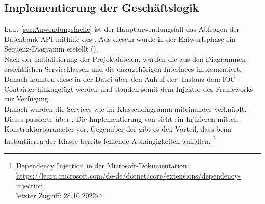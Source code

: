 \subsection{Implementierung der Geschäftslogik}
\label{sec:ImplementierungGeschaeftslogik}
Laut \ref{sec:Anwendungsfaelle}  ist der Hauptanwendungsfall
das Abfragen der Datenbank-\acs{API} mithilfe des . Aus diesem wurde in 
der Entwurfsphase ein Sequenz-Diagramm erstellt (\Vgl {}).\\
Nach der Initialisierung der Projektdateien, wurden die aus den Diagrammen ersichtlichen Serviceklassen
und die dazugehörigen Interfaces implementiert. \\Danach konnten diese in der Datei 
über den Aufruf  der -Instanz dem \acs{IOC}-Container 
hinzugefügt werden und standen somit dem Injektor des Frameworks zur Verfügung. \\Danach 
wurden die Services wie im Klassendiagramm  miteinander verknüpft.
Dieses passierte über . Die Implementierung von  
sieht ein Injizieren mittels Konstruktorparameter vor. Gegenüber der  gibt es
den Vorteil, dass beim Instantiieren der Klasse bereits fehlende Abhängigkeiten auffallen.
\footnote{Dependency Injection in der Microsoft-Dokumentation:\\ 
\url{https://learn.microsoft.com/de-de/dotnet/core/extensions/dependency-injection}, \\
letzter Zugriff: 28.10.2022}
\clearpage

